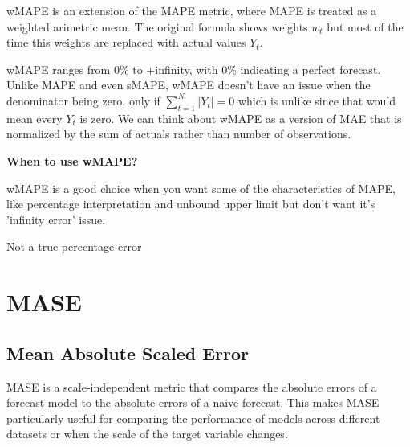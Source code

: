 wMAPE is an extension of the MAPE metric, where MAPE is treated as a weighted arimetric mean. The original formula shows weights $w_{t}$ but most of the time this weights are replaced
with actual values $Y_{t}$.

\begin{center}
\end{center}


wMAPE ranges from 0\% to +infinity, with 0\% indicating a perfect forecast. Unlike MAPE and even sMAPE, wMAPE doesn't have an issue when the denominator being zero,
only if $\sum_{t=1}^{N}|Y_{t}| = 0$ which is unlike since that would mean every $Y_{t}$ is zero. We can think about wMAPE as a version of MAE that is normalized by the sum of
actuals rather than number of observations.

\textbf{When to use wMAPE?}

wMAPE is a good choice when you want some of the characteristics of MAPE, like percentage interpretation and unbound upper limit but don't want it's 'infinity error' issue.

{
    \item Not a true percentage error
}

\clearpage
\thispagestyle{regressionstyle}
\section{MASE}
\subsection{Mean Absolute Scaled Error}

MASE is a scale-independent metric that compares the absolute errors of a forecast model to the absolute errors of a naive forecast.
This makes MASE particularly useful for comparing the performance of models across different datasets or when the scale of the target variable changes.

